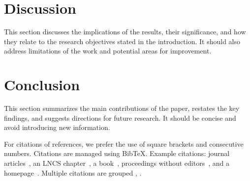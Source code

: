 \documentclass[runningheads]{llncs}
\begin{document}
\section{Discussion}

This section discusses the implications of the results, their significance,
and how they relate to the research objectives stated in the introduction.
It should also address limitations of the work and potential areas for
improvement.

\section{Conclusion}

This section summarizes the main contributions of the paper, restates the
key findings, and suggests directions for future research. It should be
concise and avoid introducing new information.

For citations of references, we prefer the use of square brackets
and consecutive numbers. Citations are managed using BibTeX.
Example citations: journal articles~\cite{ref_article1}, an LNCS 
chapter~\cite{ref_lncs1}, a book~\cite{ref_book1}, proceedings 
without editors~\cite{ref_proc1}, and a homepage~\cite{ref_url1}. 
Multiple citations are grouped
\cite{ref_article1,ref_lncs1,ref_book1},
\cite{ref_article1,ref_book1,ref_proc1,ref_url1}.

\end{document}
